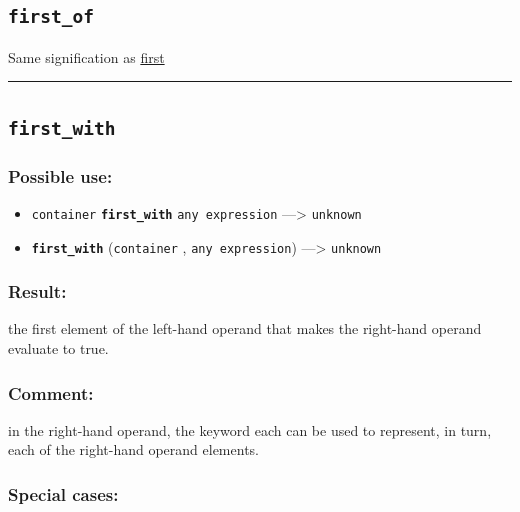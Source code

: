 \documentclass[]{book}
\providecommand{\tightlist}{%
  \setlength{\itemsep}{0pt}\setlength{\parskip}{0pt}}
\theoremstyle{definition}
\theoremstyle{definition}
\theoremstyle{definition}
\theoremstyle{remark}
\begin{document}
\subsection{\texorpdfstring{\texttt{first\_of}}{first\_of}}\label{first_of}

Same signification as \href{operators-d-to-h.html\#first}{first}

\begin{center}\rule{0.5\linewidth}{\linethickness}\end{center}

\subsection{\texorpdfstring{\texttt{first\_with}}{first\_with}}\label{first_with}

\subsubsection{Possible use:}\label{possible-use-168}

\begin{itemize}
\tightlist
\item
  \texttt{container} \textbf{\texttt{first\_with}}
  \texttt{any\ expression} ---\textgreater{} \texttt{unknown}
\item
  \textbf{\texttt{first\_with}} (\texttt{container} ,
  \texttt{any\ expression}) ---\textgreater{} \texttt{unknown}
\end{itemize}

\subsubsection{Result:}\label{result-162}

the first element of the left-hand operand that makes the right-hand
operand evaluate to true.

\subsubsection{Comment:}\label{comment-38}

in the right-hand operand, the keyword each can be used to represent, in
turn, each of the right-hand operand elements.

\subsubsection{Special cases:}\label{special-cases-62}
\end{document}

